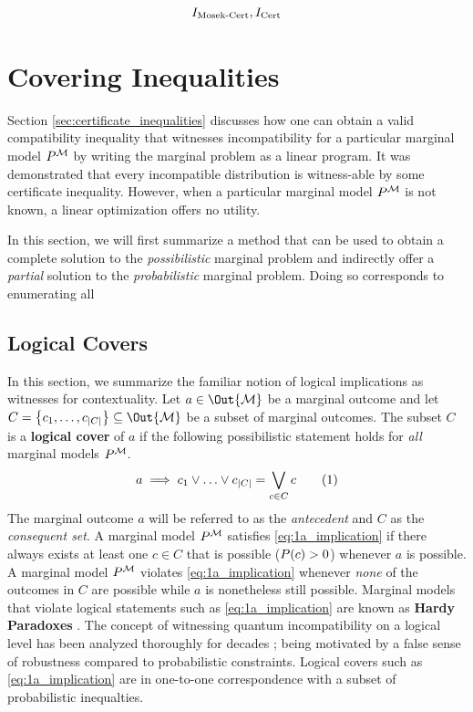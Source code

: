 \documentclass[aps, 10pt, english, twoside, pra, nofootinbib, longbibliography]{revtex4-1}
\theoremstyle{plain}
\theoremstyle{definition}
\theoremstyle{remark}
\newcommand{\mscenario}{\mathcal{M}}
\newcommand{\term}[1]{\textcolor{Mahogany}{\textbf{#1}}}
\begin{document}
    \[ I_\text{Mosek-Cert}, I_\text{Cert} \]

    \section{Covering Inequalities}

    Section \ref{sec:certificate_inequalities} discusses how one can obtain a valid compatibility inequality that witnesses incompatibility for a particular marginal model $\prob^{\mscenario}$ by writing the marginal problem as a linear program. It was demonstrated that every incompatible distribution is witness-able by some certificate inequality. However, when a particular marginal model $\prob^{\mscenario}$ is not known, a linear optimization offers no utility.

    In this section, we will first summarize a method that can be used to obtain a complete solution to the \textit{possibilistic} marginal problem and indirectly offer a \textit{partial} solution to the \textit{probabilistic} marginal problem. Doing so corresponds to enumerating all
    \subsection{Logical Covers}
    In this section, we summarize the familiar notion of logical implications as witnesses for contextuality. Let $a \in \Out{\mscenario}$ be a marginal outcome and let $C = \bc{c_1, \ldots, c_{\abs{C}}} \subseteq \Out{\mscenario}$ be a subset of marginal outcomes. The subset $C$ is a \term{logical cover} of $a$ if the following possibilistic statement holds for \textit{all} marginal models $\prob^{\mscenario}$.
    \[ a \implies c_1 \vee \ldots \vee c_{\abs{C}} = \bigvee_{c \in C} c \eq \label{eq:1a_implication} \]
    The marginal outcome $a$ will be referred to as the \textit{antecedent} and $C$ as the \textit{consequent set}. A marginal model $\prob^{\mscenario}$ satisfies \cref{eq:1a_implication} if there always exists at least one $c \in C$ that is possible ($\prob[][c] > 0$) whenever $a$ is possible. A marginal model $\prob^{\mscenario}$ violates \cref{eq:1a_implication} whenever \textit{none} of the outcomes in $C$ are possible while $a$ is nonetheless still possible. Marginal models that violate logical statements such as \cref{eq:1a_implication} are known as \term{Hardy Paradoxes} \cite{Inflation,Mansfield_2012,Mancinska_2014}. The concept of witnessing quantum incompatibility on a logical level has been analyzed thoroughly for decades \cite{Greenberger_1990,Abramsky_2012}; being motivated by a false sense of robustness compared to probabilistic constraints. Logical covers such as \cref{eq:1a_implication} are in one-to-one correspondence with a subset of probabilistic inequalties.
\end{document}
